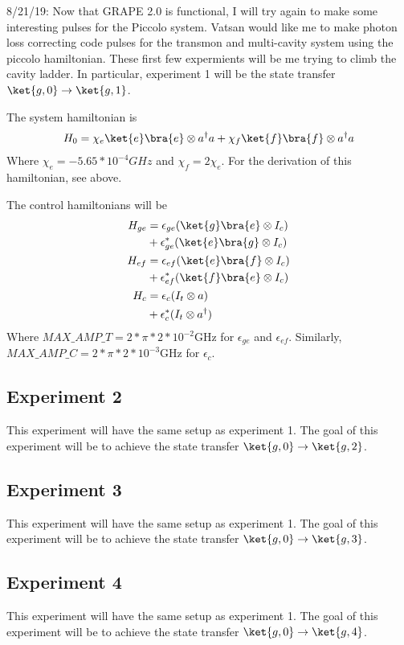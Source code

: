 \documentclass[letterpaper, 12pt]{article}
\begin{document}
8/21/19: Now that GRAPE 2.0 is functional, I will try again to make some interesting pulses for the Piccolo system. Vatsan would like me to make photon loss correcting code pulses for the transmon and multi-cavity system using the piccolo hamiltonian. These first few expermients will be me trying to climb the cavity ladder. In particular, experiment 1 will be the state transfer $\ket{g, 0} \rightarrow \ket{g, 1}$.

The system hamiltonian is
\begin{align*}
  H_{0} = \chi_{e}\ket{e}\bra{e} \otimes a^{\dagger}a + \chi_{f}\ket{f}\bra{f} \otimes a^{\dagger}a\\
\end{align*}
Where $\chi_{e} = -5.65*10^{-4} GHz$ and $\chi_{f} = 2 \chi_{e}$. For the derivation of this hamiltonian, see above.

The control hamiltonians will be
\begin{align*}
  H_{ge} &= \epsilon_{ge} (\ket{g}\bra{e} \otimes I_{c})\\
         &+ \epsilon_{ge}^{*} (\ket{e}\bra{g} \otimes I_{c})\\
  H_{ef} &= \epsilon_{ef} (\ket{e}\bra{f} \otimes I_{c})\\
         &+ \epsilon_{ef}^{*} (\ket{f}\bra{e} \otimes I_{c})\\
  H_{c} &= \epsilon_{c} (I_{t} \otimes a)\\
        &+ \epsilon_{c}^{*} (I_{t} \otimes a^{\dagger})\\
\end{align*}
Where $MAX\_AMP\_T = 2 * \pi * 2 * 10^{-2}$GHz for $\epsilon_{ge}$ and $\epsilon_{ef}$. Similarly, $MAX\_AMP\_C = 2 * \pi * 2 * 10^{-3}$GHz for $\epsilon_{c}$.

\subsection{Experiment 2}
This experiment will have the same setup as experiment 1. The goal of this experiment will be to achieve the state transfer $\ket{g, 0} \rightarrow \ket{g, 2}$.

\subsection{Experiment 3}
This experiment will have the same setup as experiment 1. The goal of this experiment will be to achieve the state transfer $\ket{g, 0} \rightarrow \ket{g, 3}$.

\subsection{Experiment 4}
This experiment will have the same setup as experiment 1. The goal of this experiment will be to achieve the state transfer $\ket{g, 0} \rightarrow \ket{g, 4}$.
\end{document}

